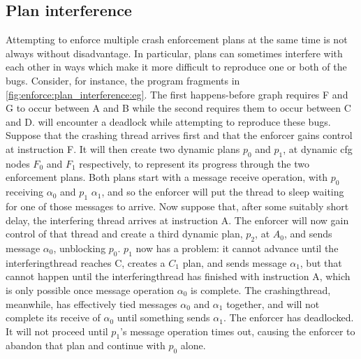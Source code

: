 \subsection{Plan interference}
\label{sect:enforce:plan_interference}

Attempting to enforce multiple crash enforcement plans at the same
time is not always without disadvantage.  In particular, plans can
sometimes interfere with each other in ways which make it more
difficult to reproduce one or both of the bugs.  Consider, for
instance, the program fragments in
\autoref{fig:enforce:plan_interference:eg}.  The first happens-before
graph requires F and G to occur between A and B while the second
requires them to occur between C and D.  {\Technique} will encounter a
deadlock while attempting to reproduce these bugs.  Suppose that the
crashing thread arrives first and that the enforcer gains control at
instruction F.  It will then create two dynamic plans $p_0$ and $p_1$,
at \gls{dynamic cfg} nodes $F_0$ and $F_1$ respectively, to represent
its progress through the two enforcement plans.  Both plans start with
a message receive operation, with $p_0$ receiving $\alpha_0$ and $p_1$
$\alpha_1$, and so the enforcer will put the thread to sleep waiting
for one of those messages to arrive.  Now suppose that, after some
suitably short delay, the interfering thread arrives at instruction A.
The enforcer will now gain control of that thread and create a third
dynamic plan, $p_2$, at $A_0$, and sends message $\alpha_0$,
unblocking $p_0$.  $p_1$ now has a problem: it cannot advance until
the \gls{interferingthread} reaches C, creates a $C_1$ plan, and sends
message $\alpha_1$, but that cannot happen until the
\gls{interferingthread} has finished with instruction A, which is only
possible once message operation $\alpha_0$ is complete.  The
\gls{crashingthread}, meanwhile, has effectively tied messages
$\alpha_0$ and $\alpha_1$ together, and will not complete its receive
of $\alpha_0$ until something sends $\alpha_1$.  The enforcer has
deadlocked.  It will not proceed until $p_1$'s message operation times
out, causing the enforcer to abandon that plan and continue with $p_0$
alone.

